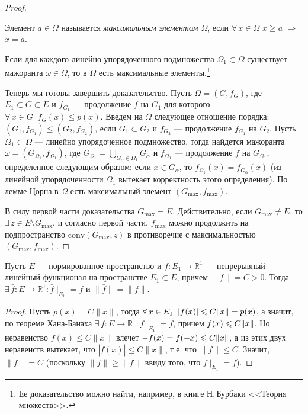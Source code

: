\documentclass[10pt,titlepage, a4paper]{article}
\begin{document}
\begin{proof}
\begin{defen}
Элемент $a\in\Omega$ называется \emph{максимальным элементом
$\Omega$}, если $\forall\,x\in\Omega$ $x\geqslant a$ $\Rightarrow$
$x=a$.
\end{defen}

\begin{lemm}
Если для каждого линейно упорядоченного подмножества
$\Omega_1\subset \Omega$ существует мажоранта $\omega\in\Omega$, то
в $\Omega$ есть максимальные элементы.\footnote{Ее доказательство
можно найти, например, в книге Н.\,Бурбаки <<Теория множеств>>.}
\end{lemm}

Теперь мы готовы завершить доказательство. Пусть $\Omega=(G, f_G)$,
где $E_1\subset G\subset E$ и $f_{G_1}$ --- продолжение $f$ на $G_1$
для которого $\forall\,x\in G\;\;f_G(x)\leqslant p(x)$. Введем на
$\Omega$ следующее отношение порядка:
$(G_1,f_{G_1})\leqslant(G_2,f_{G_2})$, если $G_1\subset G_2$ и
$f_{G_2}$ --- продолжение $f_{G_1}$ на $G_2$. Пусть $\Omega_1\subset
\Omega$ --- линейно упорядоченное подмножество, тогда найдется
мажоранта $\omega=(G_{\Omega_1},f_{\Omega_1})$, где
$G_{\Omega_1}=\bigcup\limits_{G_\alpha\in\Omega_1}G_\alpha$ и
$f_{\Omega_1}$ --- продолжение $f$ на $G_{\Omega_1}$, определенное
следующим образом: если $x\in G_\alpha$, то
$f_{\Omega_1}(x)=f_{G_\alpha}(x)$ (из линейной упорядоченности
$\Omega_1$ вытекает корректность этого определения). По лемме Цорна
в $\Omega$ есть максимальный элемент $(G_{\max},f_{\max})$.

В силу первой части доказательства $G_{\max}=E$. Действительно, если
$G_{\max}\neq E$, то $\exists\,z\in E\setminus G_{\max}$, и согласно
первой части, $f_{\max}$ можно продолжить на подпространство
$\mathrm{conv}(G_{\max},z)$ в противоречие с максимальностью
$(G_{\max},f_{\max})$.
\end{proof}

\begin{sled}
Пусть $E$ --- нормированное пространство и $f\colon
E_1\to\mathbb{R}^1$ --- непрерывный линейный функционал на
пространстве $E_1\subset E$, причем $\|f\|=C>0$. Тогда
$\exists\,\bar{f}\colon E\to \mathbb{R}^1:\bar{f}\mid_{E_1}=f$ и
$\|\bar{f}\|=\|f\|$.
\end{sled}

\begin{proof}
Пусть $p(x)=C\|x\|$, тогда $\forall\,x\in E_1\;\;|f(x)|\p\leqslant
C\|x\|\p=p(x)$, а значит, по теореме Хана-Банаха
$\exists\,\bar{f}\colon E\to\mathbb{R}^1: \bar{f}\mid_{E_1}=f$,
причем $\bar{f}(x)\p\leqslant C\|x\|$. Но неравенство
$\bar{f}(x)\leqslant C\|x\|$ влечет
$-\bar{f}(x)=\bar{f}(-x)\p\leqslant C\|x\|$, а из этих двух
неравенств вытекает, что $|\bar{f}(x)|\leqslant C\|x\|$, т.е. что
$\|\bar{f}\|\leqslant C$. Значит, $\|\bar{f}\|=C$ (поскольку
$\|\bar{f}\|\geqslant\|f\|$ ввиду того, что $\bar{f}\mid_{E_1}=f$).
\end{proof}
\end{document}
